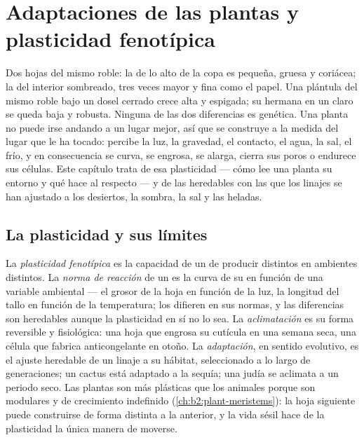 \chapter{Adaptaciones de las plantas y plasticidad fenotípica}\label{ch:b2:plant-plasticity}

Dos hojas del mismo roble: la de lo alto de la copa es pequeña, gruesa y
coriácea; la del interior sombreado, tres veces mayor y fina como el
papel. Una plántula del mismo roble bajo un dosel cerrado crece alta y
espigada; su hermana en un claro se queda baja y robusta. Ninguna de las
dos diferencias es genética. Una planta no puede irse andando a un lugar
mejor, así que se construye a la medida del lugar que le ha tocado:
percibe la luz, la gravedad, el contacto, el agua, la sal, el frío, y en
consecuencia se curva, se engrosa, se alarga, cierra sus poros o endurece
sus células. Este capítulo trata de esa plasticidad --- cómo lee una planta
su entorno y qué hace al respecto --- y de las  heredables con
las que los linajes se han ajustado a los desiertos, la sombra, la sal y
las heladas.

\section{La plasticidad y sus límites}

\begin{definition}\label{def:b2:plant-plasticity:plasticity}
La \emph{plasticidad fenotípica} es la capacidad de un  de
producir  distintos en ambientes distintos. La \emph{norma de
reacción} de un  es la curva de su  en función de una
variable ambiental --- el grosor de la hoja en función de la luz, la
longitud del tallo en función de la temperatura; los  difieren en
sus normas, y las diferencias son heredables aunque la plasticidad en sí
no lo sea. La \emph{aclimatación} es su forma reversible y fisiológica:
una hoja que engrosa su cutícula en una semana seca, una célula que
fabrica anticongelante en otoño. La \emph{adaptación}, en sentido
evolutivo, es el ajuste heredable de un linaje a su hábitat, seleccionado
a lo largo de generaciones; un cactus está adaptado a la sequía; una judía
se aclimata a un periodo seco. Las plantas son más plásticas que los
animales porque son modulares y de crecimiento indefinido
(\cref{ch:b2:plant-meristems}): la hoja siguiente puede construirse de
forma distinta a la anterior, y la vida sésil hace de la plasticidad la
única manera de moverse.
\end{definition}

